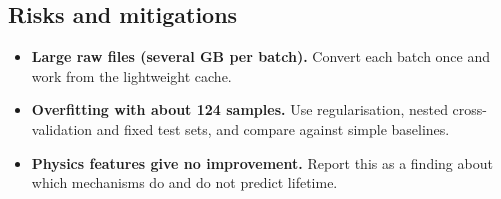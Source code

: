 \noindent{}

\subsection{Risks and mitigations}
\begin{itemize}
  \item \textbf{Large raw files (several GB per batch).} Convert each batch
  once and work from the lightweight cache.
  \item \textbf{Overfitting with about 124 samples.} Use regularisation,
  nested cross-validation and fixed test sets, and compare against simple
  baselines.
  \item \textbf{Physics features give no improvement.} Report this as a
  finding about which mechanisms do and do not predict lifetime.
\end{itemize}

